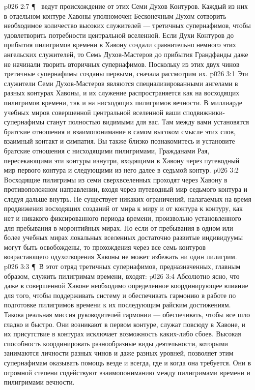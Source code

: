 \vs p026 2:7 \P\  ведут происхождение от этих Семи Духов Контуров. Каждый из них в отдельном контуре Хавоны уполномочен Бесконечным Духом сотворить необходимое количество высоких служителей --- третичных супернафимов, чтобы удовлетворить потребности центральной вселенной. Если Духи Контуров до прибытия пилигримов времени в Хавону создали сравнительно немного этих ангельских служителей, то Семь Духов\hyp{}Мастеров до прибытия Грандфанды даже не начинали творить вторичных супернафимов. Поскольку из этих двух чинов третичные супернафимы созданы первыми, сначала рассмотрим их.
\vs p026 3:1 Эти служители Семи Духов\hyp{}Мастеров являются специализированными ангелами в разных контурах Хавоны, и их служение распространяется как на восходящих пилигримов времени, так и на нисходящих пилигримов вечности. В миллиарде учебных миров совершенной центральной вселенной ваши сподвижники\hyp{}супернафимы станут полностью видимыми для вас. Там между вами установятся братские отношения и взаимопонимание в самом высоком смысле этих слов, взаимный контакт и симпатия. Вы также близко познакомитесь и установите братские отношения с нисходящими пилигримами, Гражданами Рая, пересекающими эти контуры изнутри, входящими в Хавону через путеводный мир первого контура и следующими из него далее в седьмой контур.
\vs p026 3:2 Восходящие пилигримы из семи сверхвселенных проходят через Хавону в противоположном направлении, входя через путеводный мир седьмого контура и следуя дальше внутрь. Не существует никаких ограничений, налагаемых на время продвижения восходящих созданий от мира к миру и от контура к контуру, как нет и никакого фиксированного периода времени, произвольно установленного для пребывания в моронтийных мирах. Но если от пребывания в одном или более учебных мирах локальных вселенных достаточно развитые индивидуумы могут быть освобождены, то прохождения через все семь контуров возрастающего одухотворения Хавоны не может избежать ни один пилигрим.
\vs p026 3:3 \P\ В этот отряд третичных супернафимов, предназначенных, главным образом, служить пилигримам времени, входят:
\vs p026 3:4 \bibnobreakspace {} Абсолютно ясно, что даже в совершенной Хавоне необходимо определенное координирующее влияние для того, чтобы поддерживать систему и обеспечивать гармонию в работе по подготовке пилигримов времени к их последующим райским достижениям. Такова реальная миссия руководителей гармонии --- обеспечивать, чтобы все шло гладко и быстро. Они возникают в первом контуре, служат повсюду в Хавоне, и их присутствие в контурах исключает возможность каких\hyp{}либо сбоев. Высокая способность координировать разнообразные виды деятельности, которыми занимаются личности разных чинов и даже разных уровней, позволяет этим супернафимам оказывать помощь везде и всегда, где и когда она требуется. Они в огромной степени содействуют взаимопониманию между пилигримами времени и пилигримами вечности.
